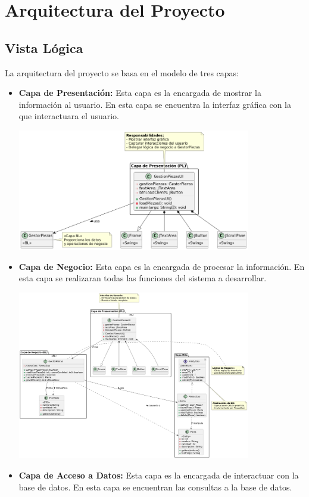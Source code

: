 \section*{Arquitectura del Proyecto}

\subsection*{Vista Lógica}
La arquitectura del proyecto se basa en el modelo de tres capas: 
\begin{itemize}
    \item \textbf{Capa de Presentación:} Esta capa es la encargada de mostrar la información al usuario. 
    En esta capa se encuentra la interfaz gráfica con la que interactuara el usuario.
    \newline
    \begin{center}
        
        \includegraphics[width=0.8\textwidth]{imag/ImagenDiagramaUmlCapaPresentacion.png}
    \newline
    \end{center}
     \item \textbf{Capa de Negocio:} Esta capa es la encargada de procesar la información. 
    En esta capa se realizaran todas las funciones del sistema a desarrollar.
    \newline
     \begin{center}
 
        \includegraphics[width=0.8\textwidth]{imag/ImagenDiagramaUmlBussinesLayer.png}
    \newline
    \end{center}
    \item \textbf{Capa de Acceso a Datos:} Esta capa es la encargada de interactuar con la base de datos. 
    En esta capa se encuentran las consultas a la base de datos.
    \newline
    \begin{center}


\end{center}
\end{itemize}
